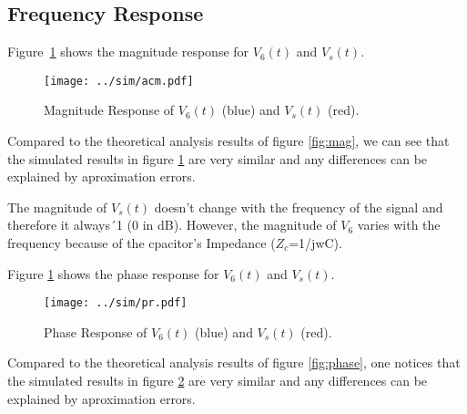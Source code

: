 \subsection{Frequency Response}

Figure~\ref{fig:acm} shows the magnitude response for $V_6(t)$ and $V_s(t)$. 

\begin{figure}[h] \centering
\texttt{[image: ../sim/acm.pdf]}
\caption{Magnitude Response of $V_6(t)$ (blue) and $V_s(t)$ (red).}
\label{fig:acm}
\end{figure}

Compared to the theoretical analysis results of figure \ref{fig:mag}, we can see that the simulated results in figure \ref{fig:acm} are very similar and any differences can be explained by aproximation errors.

The magnitude of $V_s(t)$ doesn't change with the frequency of the signal and therefore it always´1 (0 in dB). However, the magnitude of $V_6$ varies with the frequency because of the cpacitor's Impedance ($Z_c$=1/jwC).

Figure \ref{fig:acm} shows the phase response for $V_6(t)$ and $V_s(t)$.

\begin{figure}[h] \centering
\texttt{[image: ../sim/pr.pdf]}
\caption{Phase Response of $V_6(t)$ (blue) and $V_s(t)$ (red).}
\label{fig:pr}
\end{figure}

Compared to the theoretical analysis results of figure \ref{fig:phase}, one notices that the simulated results in figure \ref{fig:pr} are very similar and any differences can be explained by aproximation errors.

